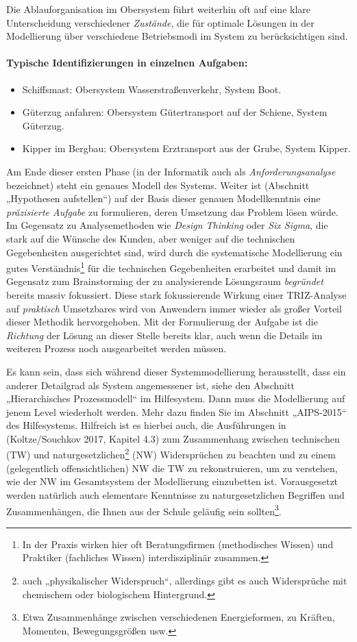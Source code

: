 \documentclass[11pt,a4paper]{article}
\begin{document}
Die Ablauforganisation im Obersystem führt weiterhin oft auf eine klare
Unterscheidung verschiedener \emph{Zustände}, die für optimale Lösungen in der
Modellierung über verschiedene Betriebsmodi im System zu berücksichtigen sind.

\paragraph{Typische Identifizierungen in einzelnen Aufgaben:}
\begin{itemize}[noitemsep]
\item Schiffsmast: Obersystem Wasserstraßenverkehr, System Boot.
\item Güterzug anfahren: Obersystem Gütertransport auf der Schiene, System
  Güterzug. 
\item Kipper im Bergbau: Obersystem Erztransport aus der Grube, System
  Kipper. 
\end{itemize}

Am Ende dieser ersten Phase (in der Informatik auch als
\emph{Anforderungsanalyse} bezeichnet) steht ein genaues Modell des Systems.
Weiter ist (Abschnitt „Hypothesen aufstellen“) auf der Basis dieser genauen
Modellkenntnis eine \emph{präzisierte Aufgabe} zu formulieren, deren Umsetzung
das Problem lösen würde. Im Gegensatz zu Analysemethoden wie \emph{Design
  Thinking} oder \emph{Six Sigma}, die stark auf die Wünsche des Kunden, aber
weniger auf die technischen Gegebenheiten ausgerichtet sind, wird durch die
systematische Modellierung ein gutes Verständnis\footnote{In der Praxis wirken
  hier oft Beratungsfirmen (methodisches Wissen) und Praktiker (fachliches
  Wissen) interdisziplinär zusammen.} für die technischen Gegebenheiten
erarbeitet und damit im Gegensatz zum Brainstorming der zu analysierende
Lösungsraum \emph{begründet} bereits massiv fokussiert.  Diese stark
fokussierende Wirkung einer TRIZ-Analyse auf \emph{praktisch} Umsetzbares wird
von Anwendern immer wieder als großer Vorteil dieser Methodik hervorgehoben.
Mit der Formulierung der Aufgabe ist die \emph{Richtung} der Lösung an dieser
Stelle bereits klar, auch wenn die Details im weiteren Prozess noch
ausgearbeitet werden müssen.

Es kann sein, dass sich während dieser Systemmodellierung herausstellt, dass
ein anderer Detailgrad als System angemessener ist, siehe den Abschnitt
„Hierarchisches Prozessmodell“ im Hilfesystem.  Dann muss die Modellierung auf
jenem Level wiederholt werden. Mehr dazu finden Sie im Abschnitt „AIPS-2015“
des Hilfesystems.  Hilfreich ist es hierbei auch, die Ausführungen in
(Koltze/Souchkov 2017, Kapitel 4.3) zum Zusammenhang zwischen technischen (TW)
und naturgesetzlichen\footnote{auch „physikalischer Widerspruch“, allerdings
  gibt es auch Widersprüche mit chemischem oder biologischem Hintergrund.}
(NW) Widersprüchen zu beachten und zu einem (gelegentlich offensichtlichen) NW
die TW zu rekonstruieren, um zu verstehen, wie der NW im Gesamtsystem der
Modellierung einzubetten ist.  Vorausgesetzt werden natürlich auch elementare
Kenntnisse zu naturgesetzlichen Begriffen und Zusammenhängen, die Ihnen aus
der Schule geläufig sein sollten\footnote{Etwa Zusammenhänge zwischen
  verschiedenen Energieformen, zu Kräften, Momenten, Bewegungsgrößen usw.}.
\end{document}
